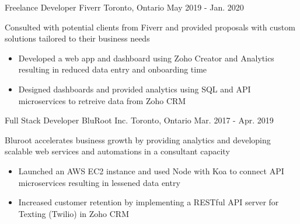 \begin{cventries}
  \cventry
    {Freelance Developer} %
    {Fiverr} %
    {Toronto, Ontario} %
    {May 2019 - Jan. 2020} %
    {
      \begin{cvitems} %
        \item[] {Consulted with potential clients from Fiverr and provided proposals with custom solutions tailored to their business needs}
        \begin{itemize}
            \item {Developed a web app and dashboard using Zoho Creator and Analytics resulting in reduced data entry and onboarding time}
            \item { Designed dashboards and provided analytics using SQL and API microservices to retreive data from Zoho CRM }
        \end{itemize}
      \end{cvitems}
    }
  \cventry
    {Full Stack Developer} %
    {BluRoot Inc.} %
    {Toronto, Ontario} %
    {Mar. 2017 - Apr. 2019} %
    {
      \begin{cvitems} %
        \item[] {Bluroot accelerates business growth by providing analytics and developing scalable web services and automations in a consultant capacity}
        \begin{itemize}
            \item {Launched an AWS EC2 instance and used Node with Koa to connect API microservices resulting in lessened data entry}
            \item {Increased customer retention by implementing a RESTful API server for Texting (Twilio) in Zoho CRM }
        \end{itemize}
      \end{cvitems}
    }

\end{cventries}
